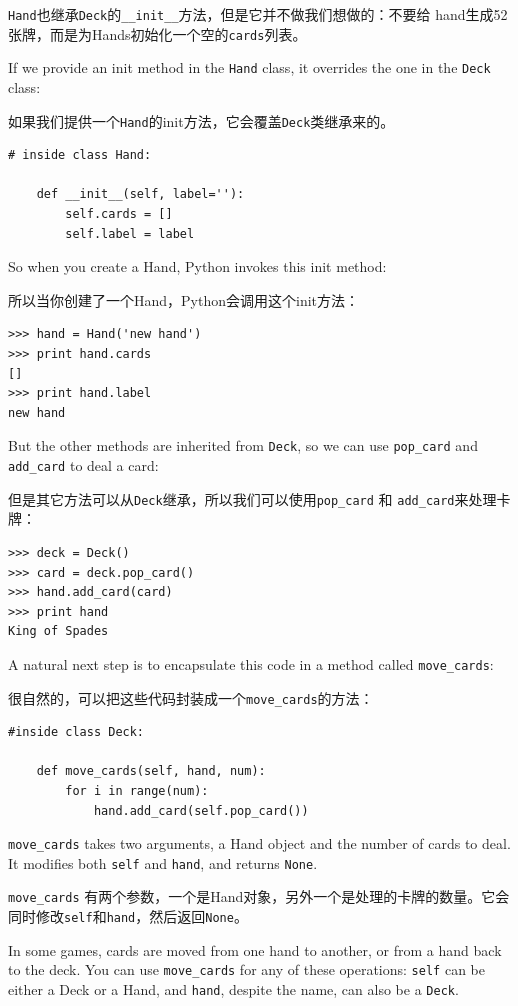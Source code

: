 \documentclass[10pt]{book}
\begin{document}
\begin{CJK}{UTF8}{gbsn}
{\tt Hand}也继承{\tt Deck}的\verb"__init__"方法，但是它并不做我们想做的：不要给
hand生成52张牌，而是为Hands初始化一个空的{\tt cards}列表。

If we provide an init method in the {\tt Hand} class, it overrides the
one in the {\tt Deck} class:

如果我们提供一个{\tt Hand}的init方法，它会覆盖{\tt Deck}类继承来的。

\begin{verbatim}
# inside class Hand:

    def __init__(self, label=''):
        self.cards = []
        self.label = label
\end{verbatim}
%
So when you create a Hand, Python invokes this init method:

所以当你创建了一个Hand，Python会调用这个init方法：

\begin{verbatim}
>>> hand = Hand('new hand')
>>> print hand.cards
[]
>>> print hand.label
new hand
\end{verbatim}
%
But the other methods are inherited from {\tt Deck}, so we can use
\verb"pop_card" and \verb"add_card" to deal a card:

但是其它方法可以从{\tt Deck}继承，所以我们可以使用\verb"pop_card" 和
\verb"add_card"来处理卡牌：

\begin{verbatim}
>>> deck = Deck()
>>> card = deck.pop_card()
>>> hand.add_card(card)
>>> print hand
King of Spades
\end{verbatim}
%
A natural next step is to encapsulate this code in a method
called \verb"move_cards":

很自然的，可以把这些代码封装成一个\verb"move_cards"的方法：

\begin{verbatim}
#inside class Deck:

    def move_cards(self, hand, num):
        for i in range(num):
            hand.add_card(self.pop_card())
\end{verbatim}
%
\verb"move_cards" takes two arguments, a Hand object and the number of
cards to deal.  It modifies both {\tt self} and {\tt hand}, and
returns {\tt None}.

\verb"move_cards" 有两个参数，一个是Hand对象，另外一个是处理的卡牌的数量。它会
同时修改{\tt self}和{\tt hand}，然后返回{\tt None}。

In some games, cards are moved from one hand to another,
or from a hand back to the deck.  You can use \verb"move_cards"
for any of these operations: {\tt self} can be either a Deck
or a Hand, and {\tt hand}, despite the name, can also be a {\tt Deck}.


\end{CJK}
\end{document}
